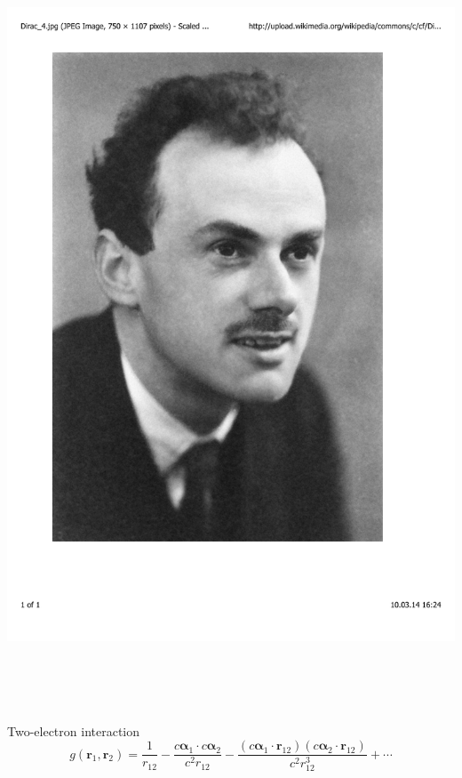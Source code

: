 \documentclass[mathserif,10pt]{beamer}
\begin{document}
\begin{frame}
\begin{columns}
\begin{column}{.40\textwidth}
	\includegraphics[viewport = 50 200 500 800, clip, scale=0.15]{figures/dirac.pdf}
    \end{column}
    \end{columns}
    \ \\
    \ \\
    \ \\
    \pause
    \centering
    Two-electron interaction
    \begin{equation}
        \nonumber
        g(\boldsymbol{r}_1,\boldsymbol{r}_2) = 
        \frac{1}{r_{12}} - \frac{c\boldsymbol{\alpha}_1\cdot c\boldsymbol{\alpha}_2}{c^2r_{12}} -
        \frac{(c\boldsymbol{\alpha}_1\cdot \boldsymbol{r}_{12})(c\boldsymbol{\alpha}_2\cdot \boldsymbol{r}_{12})}{c^2r_{12}^3}
        + \cdots
    \end{equation}
\end{frame}
\end{document}
